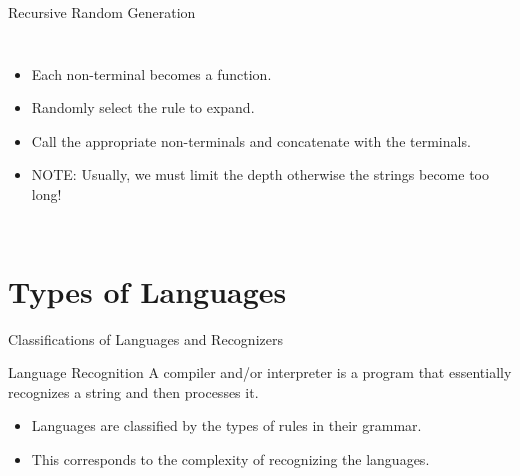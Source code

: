 \documentclass[]{beamer}
\newenvironment{code}{%
 \VerbatimEnvironment
 \begin{adjustbox}{max width=\textwidth, max height=0.7\textheight}
 \begin{BVerbatim}
  }{
  \end{BVerbatim}
 \end{adjustbox}
}
\begin{document}
\begin{frame}[fragile]{Recursive Random Generation}
\begin{columns}


\ifdefined\PYTHON
{}
\fi

\ifdefined\CPP
{}
\fi

    \begin{itemize}
        \item Each non-terminal becomes a function.
        \item Randomly select the rule to expand.
        \item Call the appropriate non-terminals and concatenate with the terminals.
        \item NOTE: Usually, we must limit the depth otherwise the strings become too long!
    \end{itemize}
    \end{columns}
\end{frame}

\section{Types of Languages}
\begin{frame}{Classifications of Languages and Recognizers}
    \begin{block}{Language Recognition}
        A compiler and/or interpreter is a program that essentially recognizes a 
        string and then processes it.
    \end{block}
    \begin{itemize}
        \item Languages are classified by the types of rules in their grammar.
        \item This corresponds to the complexity of recognizing the languages.
    \end{itemize}
\end{frame}
\end{document}
